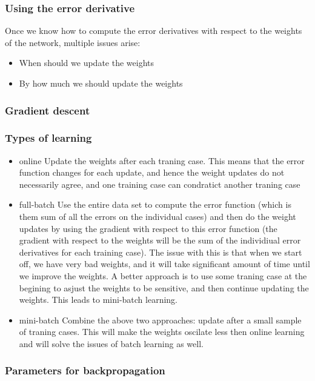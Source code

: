 \documentclass[11pt, fleqn, twoside]{article}
\begin{document}
\subsubsection {Using the error derivative}

  Once we know how to compute the error derivatives with respect to the weights of the network, multiple issues arise:

\begin{itemize}
    \item When should we update the weights
    \item By how much we should update the weights
\end{itemize}

\subsubsection{ Gradient descent}

\subsubsection{ Types of learning}

\begin{itemize}
  \item online
     Update the weights after each traning case. This means that the error function changes for each update, and hence the weight updates do not necessarily agree, and one training case can condratict another traning case
  \item full-batch
    Use the entire data set to compute the error function (which is them sum of all the errors on the individual cases) and then do the weight updates by using the gradient with respect to this error function (the gradient with respect to the weights will be the sum of the individiual error derivatives for each training case). The issue with this is that when we start off, we have very bad weights, and it will take significant amount of time until we improve the weights. A better approach is to use some traning case at the begining to asjust the weights to be sensitive, and then continue updating the weights. This leads to mini-batch learning.
  \item mini-batch
    Combine the above two approaches: update after a small sample of traning cases. This will make the weights oscilate less then online learning and will solve the issues of batch learning as well.
\end{itemize}

\subsubsection{ Parameters for backpropagation}
\end{document}
